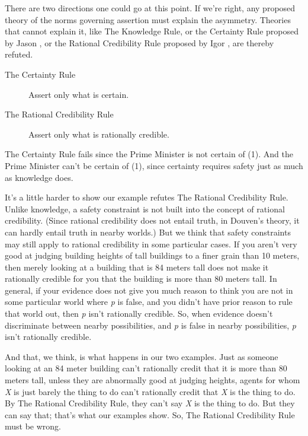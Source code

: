 There are two directions one could go at this point. If we're right, any proposed theory of the norms governing assertion must explain the asymmetry. Theories that cannot explain it, like The Knowledge Rule, or the Certainty Rule proposed by Jason \citet{Stanley2008-STAKAC}, or the Rational Credibility Rule proposed by Igor \citet{Douven2006}, are thereby refuted.

\begin{description}
\item[The Certainty Rule] Assert only what is certain.
\item[The Rational Credibility Rule] Assert only what is rationally credible.
\end{description}

\noindent The Certainty Rule fails since the Prime Minister is not certain of (1). And the Prime Minister can't be certain of (1), since certainty requires safety just as much as knowledge does. 

It's a little harder to show our example refutes The Rational Credibility Rule. Unlike knowledge, a safety constraint is not built into the concept of rational credibility. (Since rational credibility does not entail truth, in Douven's theory, it can hardly entail truth in nearby worlds.) But we think that safety constraints may still apply to rational credibility in some particular cases. If you aren't very good at judging building heights of tall buildings to a finer grain than 10 meters, then merely looking at a building that is 84 meters tall does not make it rationally credible for you that the building is more than 80 meters tall. In general, if your evidence does not give you much reason to think you are not in some particular world where \textit{p} is false, and you didn't have prior reason to rule that world out, then \textit{p} isn't rationally credible. So, when evidence doesn't discriminate between nearby possibilities, and \textit{p} is false in nearby possibilities, \textit{p} isn't rationally credible.

And that, we think, is what happens in our two examples. Just as someone looking at an 84 meter building can't rationally credit that it is more than 80 meters tall, unless they are abnormally good at judging heights, agents for whom \textit{X} is just barely the thing to do can't rationally credit that \textit{X} is the thing to do. By The Rational Credibility Rule, they can't say \textit{X} is the thing to do. But they can say that; that's what our examples show. So, The Rational Credibility Rule must be wrong.

